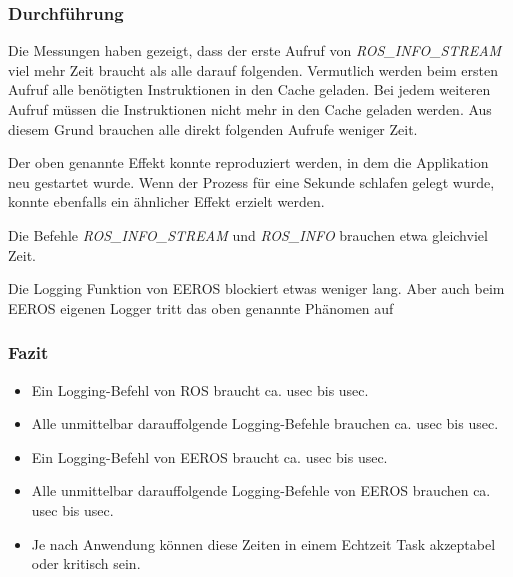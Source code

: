 \subsubsection{Durchführung}
Die Messungen haben gezeigt, dass der erste Aufruf von \textit{ROS\_INFO\_STREAM} viel mehr Zeit braucht als alle darauf folgenden.
Vermutlich werden beim ersten Aufruf alle benötigten Instruktionen in den Cache geladen.
Bei jedem weiteren Aufruf müssen die Instruktionen nicht mehr in den Cache geladen werden.
Aus diesem Grund brauchen alle direkt folgenden Aufrufe weniger Zeit.

Der oben genannte Effekt konnte reproduziert werden, in dem die Applikation neu gestartet wurde.
Wenn der Prozess für eine Sekunde schlafen gelegt wurde, konnte ebenfalls ein ähnlicher Effekt erzielt werden.

Die Befehle \textit{ROS\_INFO\_STREAM} und \textit{ROS\_INFO} brauchen etwa gleichviel Zeit.

Die Logging Funktion von EEROS blockiert etwas weniger lang.
Aber auch beim EEROS eigenen Logger tritt das oben genannte Phänomen auf

\subsubsection{Fazit}
\begin{itemize}
\item Ein Logging-Befehl von ROS braucht ca. \unit[50]{usec} bis \unit[80]{usec}.
\item Alle unmittelbar darauffolgende Logging-Befehle brauchen ca. \unit[10]{usec} bis \unit[15]{usec}.
\item Ein Logging-Befehl von EEROS braucht ca. \unit[30]{usec} bis \unit[70]{usec}.
\item Alle unmittelbar darauffolgende Logging-Befehle von EEROS brauchen ca. \unit[3]{usec} bis \unit[15]{usec}.
\item Je nach Anwendung können diese Zeiten in einem Echtzeit Task akzeptabel oder kritisch sein.
\end{itemize}




